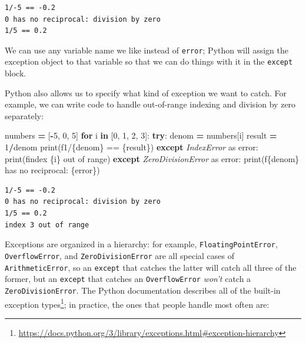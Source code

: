 \documentclass[
]{krantz}
\makeatletter
\newenvironment{Shaded}{\begin{snugshade}}{\end{snugshade}}
\newcommand{\BuiltInTok}[1]{#1}
\newcommand{\ControlFlowTok}[1]{\textcolor[rgb]{0.13,0.29,0.53}{\textbf{#1}}}
\newcommand{\DecValTok}[1]{\textcolor[rgb]{0.00,0.00,0.81}{#1}}
\newcommand{\ImportTok}[1]{#1}
\newcommand{\KeywordTok}[1]{\textcolor[rgb]{0.13,0.29,0.53}{\textbf{#1}}}
\newcommand{\NormalTok}[1]{#1}
\newcommand{\OperatorTok}[1]{\textcolor[rgb]{0.81,0.36,0.00}{\textbf{#1}}}
\newcommand{\PreprocessorTok}[1]{\textcolor[rgb]{0.56,0.35,0.01}{\textit{#1}}}
\newcommand{\SpecialCharTok}[1]{\textcolor[rgb]{0.00,0.00,0.00}{#1}}
\newcommand{\SpecialStringTok}[1]{\textcolor[rgb]{0.31,0.60,0.02}{#1}}
\renewcommand{\href}[2]{#2\footnote{\url{#1}}}
\newenvironment{kframe}{%
\medskip{}
\setlength{\fboxsep}{.8em}
 \def\at@end@of@kframe{}%
 \ifinner\ifhmode%
  \def\at@end@of@kframe{\end{minipage}}%
  \begin{minipage}{\columnwidth}%
 \fi\fi%
 \def\FrameCommand##1{\hskip\@totalleftmargin \hskip-\fboxsep
 \colorbox{shadecolor}{##1}\hskip-\fboxsep
     \hskip-\linewidth \hskip-\@totalleftmargin \hskip\columnwidth}%
 \MakeFramed {\advance\hsize-\width
   \@totalleftmargin\z@ \linewidth\hsize
   \@setminipage}}%
 {\par\unskip\endMakeFramed%
 \at@end@of@kframe}
\renewenvironment{Shaded}{\begin{kframe}}{\end{kframe}}
\makeatother
\begin{document}
\begin{verbatim}
1/-5 == -0.2
0 has no reciprocal: division by zero
1/5 == 0.2
\end{verbatim}

We can use any variable name we like instead of \texttt{error};
Python will assign the exception object to that variable
so that we can do things with it in the \texttt{except} block.

Python also allows us to specify what kind of exception we want to catch.
For example,
we can write code to handle out-of-range indexing and division by zero separately:

\begin{Shaded}
\begin{Highlighting}[]
\NormalTok{numbers }\OperatorTok{=}\NormalTok{ [}\OperatorTok{{-}}\DecValTok{5}\NormalTok{, }\DecValTok{0}\NormalTok{, }\DecValTok{5}\NormalTok{]}
\ControlFlowTok{for}\NormalTok{ i }\KeywordTok{in}\NormalTok{ [}\DecValTok{0}\NormalTok{, }\DecValTok{1}\NormalTok{, }\DecValTok{2}\NormalTok{, }\DecValTok{3}\NormalTok{]:}
    \ControlFlowTok{try}\NormalTok{:}
\NormalTok{        denom }\OperatorTok{=}\NormalTok{ numbers[i]}
\NormalTok{        result }\OperatorTok{=} \DecValTok{1}\OperatorTok{/}\NormalTok{denom}
        \BuiltInTok{print}\NormalTok{(}\SpecialStringTok{f\textquotesingle{}1/}\SpecialCharTok{\{}\NormalTok{denom}\SpecialCharTok{\}}\SpecialStringTok{ == }\SpecialCharTok{\{}\NormalTok{result}\SpecialCharTok{\}}\SpecialStringTok{\textquotesingle{}}\NormalTok{)}
    \ControlFlowTok{except} \PreprocessorTok{IndexError} \ImportTok{as}\NormalTok{ error:}
        \BuiltInTok{print}\NormalTok{(}\SpecialStringTok{f\textquotesingle{}index }\SpecialCharTok{\{i\}}\SpecialStringTok{ out of range\textquotesingle{}}\NormalTok{)}
    \ControlFlowTok{except} \PreprocessorTok{ZeroDivisionError} \ImportTok{as}\NormalTok{ error:}
        \BuiltInTok{print}\NormalTok{(}\SpecialStringTok{f\textquotesingle{}}\SpecialCharTok{\{}\NormalTok{denom}\SpecialCharTok{\}}\SpecialStringTok{ has no reciprocal: }\SpecialCharTok{\{}\NormalTok{error}\SpecialCharTok{\}}\SpecialStringTok{\textquotesingle{}}\NormalTok{)}
\end{Highlighting}
\end{Shaded}

\begin{verbatim}
1/-5 == -0.2
0 has no reciprocal: division by zero
1/5 == 0.2
index 3 out of range
\end{verbatim}

Exceptions are organized in a hierarchy:
for example,
\texttt{FloatingPointError}, \texttt{OverflowError}, and \texttt{ZeroDivisionError}
are all special cases of \texttt{ArithmeticError},
so an \texttt{except} that catches the latter will catch all three of the former,
but an \texttt{except} that catches an \texttt{OverflowError}
\emph{won't} catch a \texttt{ZeroDivisionError}.
The Python documentation describes all of \href{https://docs.python.org/3/library/exceptions.html\#exception-hierarchy}{the built-in exception types};
in practice,
the ones that people handle most often are:
\end{document}
